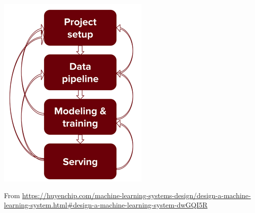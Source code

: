 
    \begin{center}
        \includegraphics[scale=0.4]{GraphicFiles/theMLProjectFlow}
    \end{center}

    \tiny From \href{https://huyenchip.com/machine-learning-systems-design/design-a-machine-learning-system.html#design-a-machine-learning-system-dwGQI5R}{https://huyenchip.com/machine-learning-systems-design/design-a-machine-learning-system.html#design-a-machine-learning-system-dwGQI5R}
